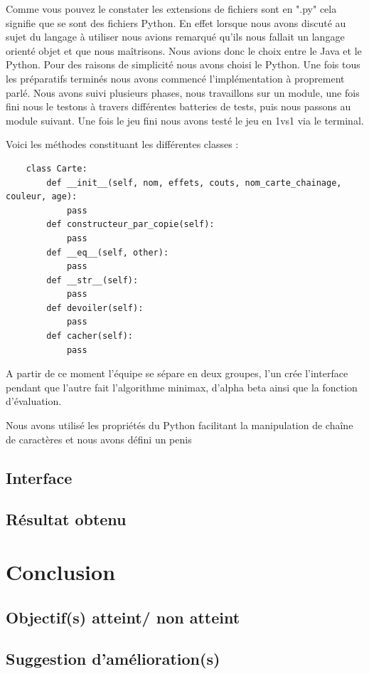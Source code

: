 \documentclass[a4paper, 12pt, french]{article}
\begin{document}
	Comme vous pouvez le constater les extensions de fichiers sont en ".py" cela signifie que se sont des fichiers
	Python. En effet lorsque nous avons discuté au sujet du langage à utiliser nous avions remarqué qu'ils nous fallait un
	langage orienté objet et que nous maîtrisons. Nous avions donc le choix entre le Java et le Python.
	Pour des raisons de simplicité nous avons choisi le Python. Une fois tous les préparatifs terminés nous avons
	commencé l'implémentation à proprement parlé. Nous avons suivi plusieurs phases, nous travaillons sur
	un module, une fois fini nous le testons à travers différentes batteries de tests, puis nous passons
	au module suivant. Une fois le jeu fini nous avons testé le jeu en 1vs1 via le terminal.

	Voici les méthodes constituant les différentes classes :
	\begin{lstlisting}
	class Carte:
		def __init__(self, nom, effets, couts, nom_carte_chainage, couleur, age):
			pass
		def constructeur_par_copie(self):
			pass
		def __eq__(self, other):
			pass
		def __str__(self):
			pass
		def devoiler(self):
			pass
		def cacher(self):
			pass
	\end{lstlisting}

	A partir de ce moment
	l'équipe se sépare en deux groupes, l'un crée l'interface pendant que l'autre fait l'algorithme minimax,
	d'alpha beta ainsi que la fonction d'évaluation.

	Nous avons utilisé les propriétés du Python facilitant la manipulation de chaîne de caractères et nous avons
	défini un penis

	\subsection{Interface}
	\subsection{Résultat obtenu}

	\section{Conclusion}
	\subsection{Objectif(s) atteint/ non atteint}
	\subsection{Suggestion d'amélioration(s)}
\end{document}
